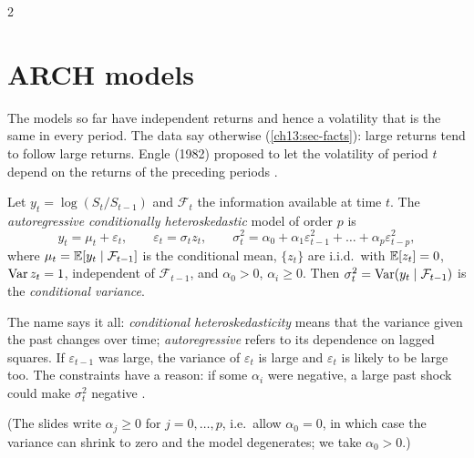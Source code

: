 \begin{paracol}{2}
\section{ARCH models}\label{ch13:sec-arch}
The models so far have independent returns and hence a volatility that is the same in every period. The data say otherwise (\cref{ch13:sec-facts}): large
returns tend to follow large returns. Engle (1982) proposed to let the volatility of period $t$ depend on the returns of the
preceding periods .

\begin{definition}[ARCH$(p)$]\label{ch13:def-arch}
Let $y_t=\log(S_t/S_{t-1})$ and $\mathcal F_t$ the information available at time $t$. The \emph{autoregressive conditionally heteroskedastic} model of order $p$ is
\begin{equation}\label{ch13:eq-arch}
  y_t=\mu_t+\varepsilon_t,\qquad \varepsilon_t=\sigma_tz_t,\qquad
  \sigma_t^2=\alpha_0+\alpha_1\varepsilon_{t-1}^2+\dots+\alpha_p\varepsilon_{t-p}^2,
\end{equation}
where $\mu_t=\mathbb{E}[y_t\mid\mathcal F_{t-1}]$ is the conditional mean, $\{z_t\}$ are i.i.d.\ with $\mathbb{E}[z_t]=0$, $\operatorname{Var} z_t=1$, independent of $\mathcal F_{t-1}$, and
$\alpha_0>0$, $\alpha_i\ge0$. Then $\sigma_t^2=\operatorname{Var}(y_t\mid\mathcal F_{t-1})$ is the \emph{conditional variance}.
\end{definition}
The name says it all: \emph{conditional heteroskedasticity} means that the variance given the past changes over time; \emph{autoregressive} refers to its dependence on lagged squares. If $\varepsilon_{t-1}$ was
large, the variance of $\varepsilon_t$ is large and $\varepsilon_t$ is likely to be large too. The constraints have a reason: if some $\alpha_i$ were negative, a large past shock could make $\sigma_t^2$ negative
.
\begin{secondary}
(The slides write $\alpha_j\ge0$ for $j=0,\dots,p$, i.e.\ allow $\alpha_0=0$, in which case the variance can shrink to zero and the model degenerates; we take $\alpha_0>0$.)
\end{secondary}


\end{paracol}

